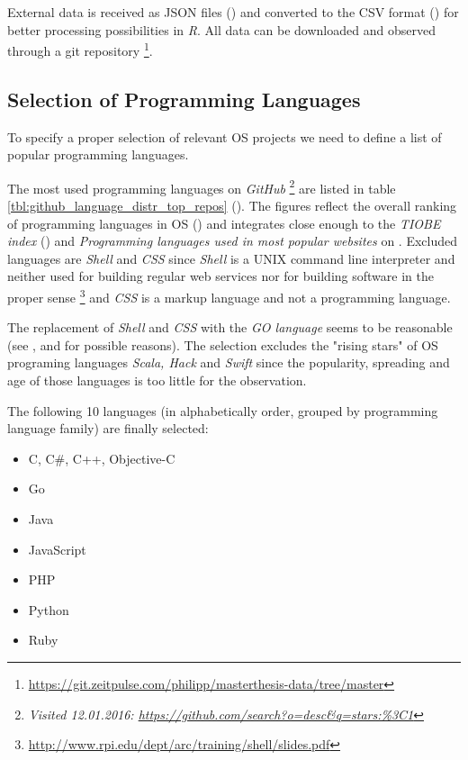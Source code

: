 External data is received as JSON files (\cite{bray2014javascript}) and converted to the CSV format (\cite{shafranovich2005common}) for better processing possibilities in \textit{R}. All data can be downloaded and observed through a git repository \footnote{\url{https://git.zeitpulse.com/philipp/masterthesis-data/tree/master}}.

\clearpage
\subsection{Selection of Programming Languages}
\label{sec:selection_of_programming_languages}

To specify a proper selection of relevant OS projects we need to define a list of popular programming languages.

The most used programming languages on \textit{GitHub} \footnote{\textit{Visited 12.01.2016:  \url{https://github.com/search?o=desc&q=stars:\%3C1}}} are listed in table \ref{tbl:github_language_distr_top_repos} (\cite{GitHubTrendingLanguages2015}). The figures reflect the overall ranking of programming languages in OS (\cite{GithubsTopCodingLanguagesShowOpenSourceHasWon:online}) and integrates close enough to the \textit{TIOBE index} (\cite{TIOBE2015}) and \textit{Programming languages used in most popular websites} on \cite{ProgrLangPopWeb2015}. Excluded languages are \textit{Shell} and \textit{CSS} since \textit{Shell} is a UNIX command line interpreter and neither used for building regular web services nor for building software in the proper sense \footnote{ \url{http://www.rpi.edu/dept/arc/training/shell/slides.pdf}} and \textit{CSS} is a markup language and not a programming language.

The replacement of \textit{Shell} and \textit{CSS} with the \textit{GO language} seems to be reasonable (see \cite{JavaReignsButGoLanguageSpikesInPopularity:online}, \cite{ThePopularityOfGo:online} and \cite{WhyGooglesProgrammingLanguageCanRivalJava:online} for possible reasons). The selection excludes the "rising stars" of OS programing languages \textit{Scala, Hack} and \textit{Swift} since the popularity, spreading and age of those languages is too little for the observation.

The following 10 languages (in alphabetically order, grouped by programming language family) are finally selected:

\begin{itemize}
	\item C, C\#, C++, Objective-C
	\item Go
	\item Java
	\item JavaScript
	\item PHP
	\item Python
	\item Ruby
\end{itemize}

